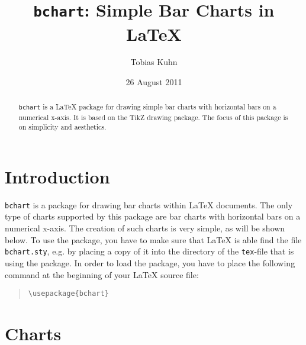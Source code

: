 \documentclass{article}
\title{\texttt{bchart}: Simple Bar Charts in \LaTeX}
\author{Tobias Kuhn}
\date{26 August 2011}
\begin{document}
\maketitle

\begin{abstract}
\texttt{bchart} is a {\LaTeX} package for drawing simple bar charts with horizontal bars on a numerical x-axis. It is based on the TikZ drawing package. The focus of this package is on simplicity and aesthetics.
\end{abstract}


\section{Introduction}

\texttt{bchart} is a package for drawing bar charts within {\LaTeX} documents. The only type of charts supported by this package are bar charts with horizontal bars on a numerical x-axis. The creation of such charts is very simple, as will be shown below. To use the package, you have to make sure that {\LaTeX} is able find the file \texttt{bchart.sty}, e.g. by placing a copy of it into the directory of the \texttt{tex}-file that is using the package. In order to load the package, you have to place the following command at the beginning of your {\LaTeX} source file:
\begin{quote}\small
\begin{verbatim}
\usepackage{bchart}
\end{verbatim}
\end{quote}


\section{Charts}
\end{document}

